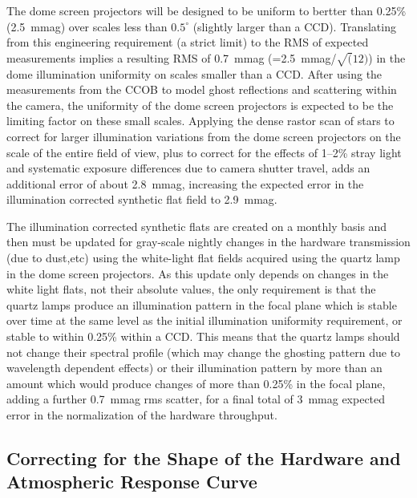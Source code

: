\documentclass[12pt,preprint]{aastex}
\begin{document}
The dome screen projectors will be designed to be uniform to bertter than
0.25\% (2.5~mmag) over scales less than $0.5^{\circ}$ (slightly larger
than a CCD). Translating from this engineering requirement (a strict
limit) to the RMS of expected measurements implies a resulting RMS of
0.7~mmag (=2.5~mmag/$\sqrt(12)$) in the dome illumination uniformity
on scales smaller than a CCD. After using the measurements from the
CCOB to model ghost reflections and scattering within the camera, the
uniformity of the dome screen projectors is expected to be the
limiting factor on these small scales. Applying the dense rastor scan
of stars to correct for larger illumination variations from the dome
screen projectors on the scale of the entire field of view, plus to
correct for the effects of 1--2\% stray light and systematic exposure
differences due to camera shutter travel, adds an additional error of
about 2.8~mmag, increasing the expected error in the illumination
corrected synthetic flat field to 2.9~mmag.

The illumination corrected synthetic flats are created on a monthly
basis and then must be updated for gray-scale nightly changes in the
hardware transmission (due to dust,etc) using the white-light flat
fields acquired using the quartz lamp in the dome screen
projectors. As this update only depends on changes in the white light
flats, not their absolute values, the only requirement is that the
quartz lamps produce an illumination pattern in the focal plane which
is stable over time at the same level as the initial illumination
uniformity requirement, or stable to within 0.25\% within a CCD. This
means that the quartz lamps should not change their spectral profile
(which may change the ghosting pattern due to wavelength dependent
effects) or their illumination pattern by more than an amount which
would produce changes of more than 0.25\% in the focal plane, adding a
further 0.7~mmag rms scatter, for a final total of 3~mmag expected
error in the normalization of the hardware throughput.

\subsection{Correcting for the Shape of the Hardware and Atmospheric
  Response Curve}
\label{sec:phi_correction}
\end{document}
